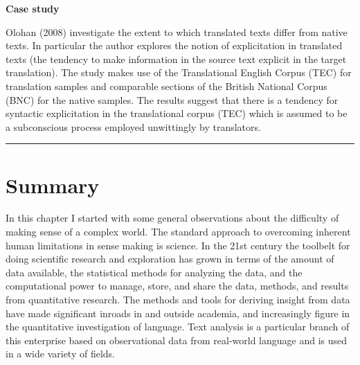 \documentclass[
  letterpaper,
]{latex/krantz}
\begin{document}
\begin{tcolorbox}[enhanced jigsaw, colbacktitle=quarto-callout-caution-color!10!white, arc=.35mm, toprule=.15mm, breakable, colframe=quarto-callout-caution-color-frame, bottomrule=.15mm, opacitybacktitle=0.6, coltitle=black, titlerule=0mm, colback=white, toptitle=1mm, bottomtitle=1mm, title=\textcolor{quarto-callout-caution-color}{\faFire}\hspace{0.5em}{Caution}, rightrule=.15mm, leftrule=.75mm, opacityback=0, left=2mm]

\textbf{Case study}

Olohan (2008) investigate the extent to which translated texts differ
from native texts. In particular the author explores the notion of
explicitation in translated texts (the tendency to make information in
the source text explicit in the target translation). The study makes use
of the Translational English Corpus (TEC) for translation samples and
comparable sections of the British National Corpus (BNC) for the native
samples. The results suggest that there is a tendency for syntactic
explicitation in the translational corpus (TEC) which is assumed to be a
subconscious process employed unwittingly by translators.

\end{tcolorbox}

\begin{center}\rule{0.5\linewidth}{0.5pt}\end{center}

\hypertarget{summary-1}{%
\section*{Summary}\label{summary-1}}


In this chapter I started with some general observations about the
difficulty of making sense of a complex world. The standard approach to
overcoming inherent human limitations in sense making is science. In the
21st century the toolbelt for doing scientific research and exploration
has grown in terms of the amount of data available, the statistical
methods for analyzing the data, and the computational power to manage,
store, and share the data, methods, and results from quantitative
research. The methods and tools for deriving insight from data have made
significant inroads in and outside academia, and increasingly figure in
the quantitative investigation of language. Text analysis is a
particular branch of this enterprise based on observational data from
real-world language and is used in a wide variety of fields.
\end{document}
